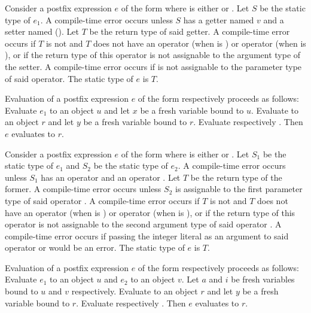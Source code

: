 \documentclass[makeidx]{article}
\begin{document}
{\LMHash{}%
Consider a postfix expression $e$ of the form 
where \op{} is either \lit{++} or \lit{-{}-}.
Let $S$ be the static type of $e_1$.
A compile-time error occurs unless $S$ has
a getter named $v$ and a setter named 
().
Let $T$ be the return type of said getter.
A compile-time error occurs if $T$ is not \DYNAMIC{}
and $T$ does not have an operator \lit{+} (when \op{} is \lit{++})
or operator \lit{-} (when \op{} is \lit{-{}-}),
or if the return type of this operator is not assignable to
the argument type of the setter.
A compile-time error occurs if  is not assignable to
the parameter type of said operator.
The static type of $e$ is $T$.

\LMHash{}%
Evaluation of a postfix expression $e$
of the form  respectively 
proceeds as follows:
Evaluate $e_1$ to an object $u$ and let $x$ be a fresh variable bound to $u$.
Evaluate  to an object $r$
and let $y$ be a fresh variable bound to $r$.
Evaluate  respectively .
Then $e$ evaluates to $r$.
\EndCase

\LMHash{}%
Consider a postfix expression $e$ of the form 
where \op{} is either \lit{++} or \lit{-{}-}.
Let $S_1$ be the static type of $e_1$
and $S_2$ be the static type of $e_2$.
A compile-time error occurs unless $S_1$ has
an operator \lit{[]} and an operator \lit{[]=}.
Let $T$ be the return type of the former.
A compile-time error occurs unless $S_2$ is assignable to
the first parameter type of said operator \lit{[]=}.
A compile-time error occurs if $T$ is not \DYNAMIC{}
and $T$ does not have an operator \lit{+} (when \op{} is \lit{++})
or operator \lit{-} (when \op{} is \lit{-{}-}),
or if the return type of this operator is not assignable to
the second argument type of said operator \lit{[]=}.
A compile-time error occurs if passing the integer literal 
as an argument to said operator \lit{+} or \lit{-} would be an error.
The static type of $e$ is $T$.

\LMHash{}%
Evaluation of a postfix expression $e$
of the form  respectively 
proceeds as follows:
Evaluate $e_1$ to an object $u$ and $e_2$ to an object $v$.
Let $a$ and $i$ be fresh variables bound to $u$ and $v$ respectively.
Evaluate  to an object $r$
and let $y$ be a fresh variable bound to $r$.
Evaluate  respectively .
Then $e$ evaluates to $r$.
\EndCase

}
\end{document}
